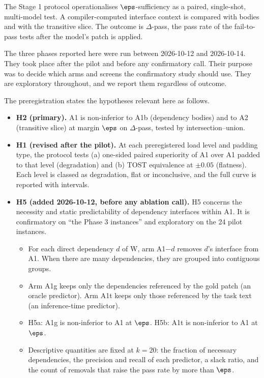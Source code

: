 The Stage 1 protocol \cite{stage1} operationalises $\eps$-sufficiency as a paired, single-shot, multi-model test. A compiler-computed interface context is compared with bodies and with the transitive slice. The outcome is $\Delta$-pass, the pass rate of the fail-to-pass tests after the model's patch is applied.

The three phases reported here were run between 2026-10-12 and 2026-10-14. They took place after the pilot and before any confirmatory call. Their purpose was to decide which arms and screens the confirmatory study should use. They are exploratory throughout, and we report them regardless of outcome.

The preregistration states the hypotheses relevant here as follows.

\begin{itemize}
\item \textbf{H2 (primary).} A1 is non-inferior to A1b (dependency bodies) and to A2 (transitive slice) at margin $\eps$ on $\Delta$-pass, tested by intersection--union.
\item \textbf{H1 (revised after the pilot).} At each preregistered load level and padding type, the protocol tests (a) one-sided paired superiority of A1 over A1 padded to that level (degradation) and (b) TOST equivalence at $\pm 0.05$ (flatness). Each level is classed as degradation, flat or inconclusive, and the full curve is reported with intervals.
\item \textbf{H5 (added 2026-10-12, before any ablation call).} H5 concerns the necessity and static predictability of dependency interfaces within A1. It is confirmatory on ``the Phase 3 instances'' and exploratory on the 24 pilot instances.
  \begin{itemize}
  \item For each direct dependency $d$ of W, arm A1$-d$ removes $d$'s interface from A1. When there are many dependencies, they are grouped into contiguous groups.
  \item Arm A1g keeps only the dependencies referenced by the gold patch (an oracle predictor). Arm A1t keeps only those referenced by the task text (an inference-time predictor).
  \item H5a: A1g is non-inferior to A1 at $\eps$. H5b: A1t is non-inferior to A1 at $\eps$.
  \item Descriptive quantities are fixed at $k=20$: the fraction of necessary dependencies, the precision and recall of each predictor, a slack ratio, and the count of removals that raise the pass rate by more than $\eps$.
  \end{itemize}
\end{itemize}

